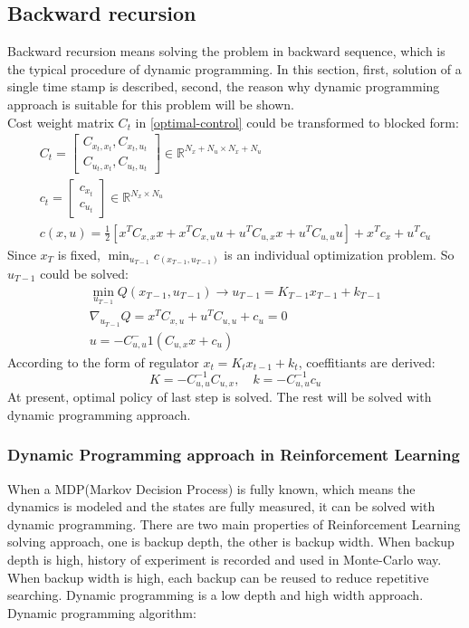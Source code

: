 \documentclass{article}
\begin{document}
\subsection{Backward recursion}
Backward recursion means solving the problem in backward sequence, which is the typical procedure of dynamic programming. In this section, first, solution of a single time stamp is described, second, the reason why dynamic programming approach is suitable for this problem will be shown.\\
Cost weight matrix $C_t$ in \eqref{optimal-control} could be transformed to blocked form:
\begin{gather}
C_t = \begin{bmatrix}
    C_{x_t, x_t}, C_{x_t, u_t}\\
    C_{u_t, x_t}, C_{u_t, u_t}
\end{bmatrix} \in \mathbb{R}^{N_x + N_u \times N_x + N_u} \\
c_t = \begin{bmatrix}
    c_{x_t}\\
    c_{u_t}
\end{bmatrix} \in \mathbb{R}^{N_x \times N_u}\\
c(x, u) = \frac{1}{2}[x^TC_{x, x}x + x^TC_{x, u}u + u^TC_{u, x}x + u^TC_{u, u}u] + x^Tc_x + u^Tc_u
\end{gather}
Since $x_T$ is fixed, $\min_{u_{T - 1}}{c_(x_{T - 1}, u_{T - 1})}$ is an individual optimization problem. So $u_{T - 1}$ could be solved:
\begin{gather}
    \min_{u_{T - 1}}Q(x_{T - 1}, u_{T - 1}) \xrightarrow{} u_{T - 1} = K_{T - 1}x_{T - 1} + k_{T - 1} \label{qvalue-least-square-problem}\\
    \nabla_{u_{T - 1}}Q = x^TC_{x, u} + u^TC_{u, u} + c_u = 0\\
    u=-C_{u, u}^-1(C_{u, x}x + c_u)
\end{gather}
According to the form of regulator $x_t = K_t x_{t-1} + k_t$, coeffitiants are derived:
\begin{equation}
    K = -C_{u, u}^{-1}C_{u, x} ,\quad k = -C_{u, u}^{-1}c_u \label{qvalue-least-square}
\end{equation}
At present, optimal policy of last step is solved. The rest will be solved with dynamic programming approach.

\subsubsection{Dynamic Programming approach in Reinforcement Learning}
When a MDP(Markov Decision Process) is fully known, which means the dynamics is modeled and the states are fully measured, it can be solved with dynamic programming. There are two main properties of Reinforcement Learning solving approach, one is backup depth, the other is backup width. When backup depth is high, history of experiment is recorded and used in Monte-Carlo way. When backup width is high, each backup can be reused to reduce repetitive searching. Dynamic programming is a low depth and high width approach.\\
Dynamic programming algorithm:\\
\end{document}
